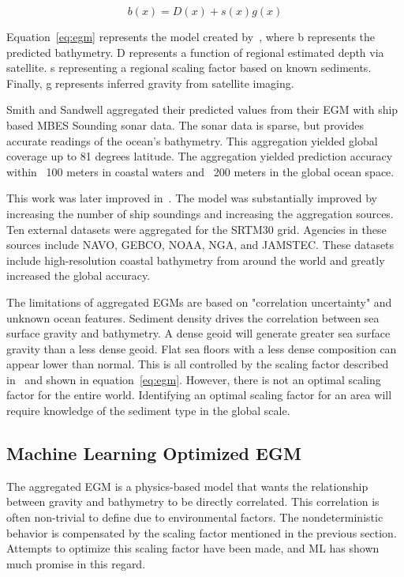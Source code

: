 \begin{equation}
    b(x) = D(x) + s(x)g(x) \label{eq:egm}
\end{equation}

\par
Equation~\ref{eq:egm} represents the model created by~\cite{smith1994bathymetric}, where b represents the predicted bathymetry.
D represents a function of regional estimated depth via satellite.
s representing a regional scaling factor based on known sediments.
Finally, g represents inferred gravity from satellite imaging.

\par
Smith and Sandwell aggregated their predicted values from their \ac{EGM} with ship based \ac{MBES} Sounding sonar data.
The sonar data is sparse, but provides accurate readings of the ocean's bathymetry.
This aggregation yielded global coverage up to 81 degrees latitude.
The aggregation yielded prediction accuracy within ~100 meters in coastal waters and ~200 meters in the global ocean space.

\par 
This work was later improved in~\cite{becker2009global}.
The model was substantially improved by increasing the number of ship soundings and increasing the aggregation sources.
Ten external datasets were aggregated for the SRTM30 grid.
Agencies in these sources include \ac{NAVO}, \ac{GEBCO}, \ac{NOAA}, \ac{NGA}, and \ac{JAMSTEC}.
These datasets include high-resolution coastal bathymetry from around the world and greatly increased the global accuracy.

\par
The limitations of aggregated \ac{EGM}s are based on "correlation uncertainty" and unknown ocean features.
Sediment density drives the correlation between sea surface gravity and bathymetry.
A dense geoid will generate greater sea surface gravity than a less dense geoid.
Flat sea floors with a less dense composition can appear lower than normal.
This is all controlled by the scaling factor described in~\cite{smith1994bathymetric} and shown in equation~\ref{eq:egm}.
However, there is not an optimal scaling factor for the entire world.
Identifying an optimal scaling factor for an area will require knowledge of the sediment type in the global scale.


\subsection{Machine Learning Optimized \ac{EGM}}\label{subsec:machine-learning-optimizedac}
The aggregated \ac{EGM} is a physics-based model that wants the relationship between gravity and bathymetry to be directly correlated.
This correlation is often non-trivial to define due to environmental factors.
The nondeterministic behavior is compensated by the scaling factor mentioned in the previous section.
Attempts to optimize this scaling factor have been made, and \ac{ML} has shown much promise in this regard.

